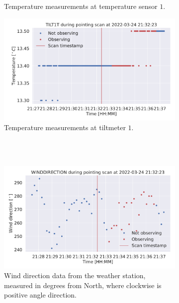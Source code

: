 \begin{figure}[H]
\begin{subfigure}[t]{0.49\textwidth}
        \caption{Temperature measurements at temperature sensor $1$.}
        \label{subfig:scan_temp1}
    \end{subfigure}
       \begin{subfigure}[t]{0.49\textwidth}
        \centering
        \includegraphics[width=\textwidth]{Feature during scans/scan_TILT1T_335.pdf}
        \caption{Temperature measurements at tiltmeter $1$.}
        \label{subfig:scan_tilt1t}
    \end{subfigure}
    \\~\\
    \begin{subfigure}[t]{0.49\textwidth}
        \centering
        \includegraphics[width=\textwidth]{Feature during scans/scan_WINDDIRECTION_335.pdf}
        \caption{Wind direction data from the weather station, measured in degrees from North, where clockwise is positive angle direction.}
        \label{subfig:scan_winddir}
    \end{subfigure}
       \begin{subfigure}[t]{0.49\textwidth}

\end{subfigure}
\end{figure}
